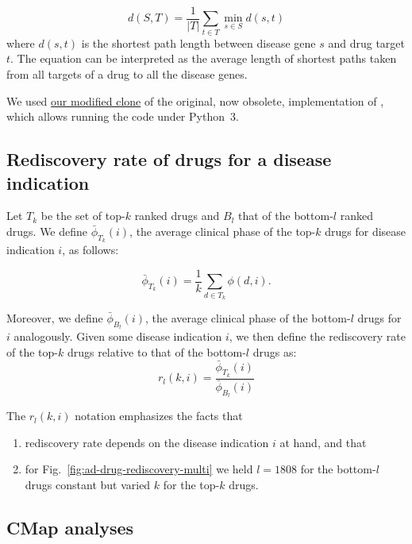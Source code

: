 \documentclass[letterpaper]{article}
\begin{document}
\begin{equation}
  d(S, T) = \frac{1}{|T|}\sum_{t \in T} \min_{s \in S} d(s, t)
\end{equation}
where $d(s,t)$ is the shortest path length between disease gene $s$ and drug
target $t$.  The equation can be interpreted as the average length of shortest
paths taken from all targets of a drug to all the disease genes.

We used \href{https://github.com/attilagk/guney_code}{our modified clone} of
the original, now obsolete, implementation of \cite{Guney2016}, which allows
running the code under Python~3.

\subsection{Rediscovery rate of drugs for a disease indication}

Let $T_k$ be the set of top-$k$ ranked drugs and $B_l$ that of the bottom-$l$
ranked drugs.  We define $\bar{\phi}_{T_k}(i)$, the average clinical phase of the top-$k$ drugs for
disease indication $i$, as follows:

\begin{equation}
  \bar{\phi}_{T_k}(i) = \frac{1}{k} \sum_{d \in T_k} \phi(d, i).
  \label{eq:phase-top-k}
\end{equation}

Moreover, we define $\bar{\phi}_{B_l}(i)$, the average clinical phase of the bottom-$l$
drugs for $i$ analogously.  Given some disease indication $i$, we then define the rediscovery rate of the top-$k$
drugs relative to that of the bottom-$l$ drugs as:
\begin{equation}
  r_l(k, i) = \frac{\bar{\phi}_{T_k}(i)}{\bar{\phi}_{B_l}(i)}
  \label{eq:rediscovery-rate}
\end{equation}

The $r_l(k, i)$ notation emphasizes the facts that
\begin{enumerate}
  \item rediscovery rate depends on the disease indication $i$ at hand, and
    that
  \item for
    Fig.~\ref{fig:ad-drug-rediscovery-multi}
    we held $l=1808$ for the bottom-$l$ drugs constant but varied $k$ for the
    top-$k$ drugs.
\end{enumerate}

\subsection{CMap analyses}
\end{document}
